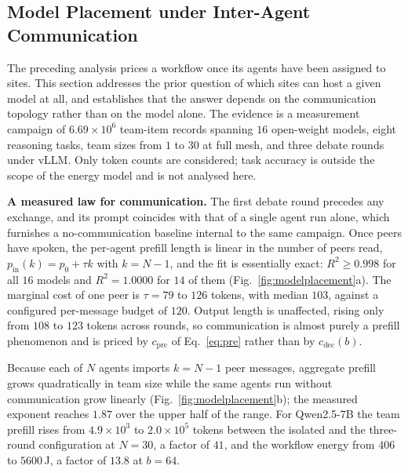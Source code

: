 \documentclass[journal]{IEEEtran}
\newif\ifshowchanges \showchangestrue
\newcommand{\ROOF}{\ifshowchanges\color{green!45!black}\fi}
\begin{document}
\subsection{\ROOF{}Model Placement under Inter-Agent Communication}\label{sec:modelplacement}
The preceding analysis prices a workflow once its agents have been assigned to sites. This
section addresses the prior question of which sites can host a given model at all, and
establishes that the answer depends on the communication topology rather than on the model alone.
The evidence is a measurement campaign of $6.69\times10^{6}$ team-item records spanning $16$
open-weight models, eight reasoning tasks, team sizes from $1$ to $30$ at full mesh, and three
debate rounds under vLLM. Only token counts are considered; task accuracy is outside the scope of
the energy model and is not analysed here.

\ROOF{}\textbf{A measured law for communication.} The first debate round precedes any exchange, and its
prompt coincides with that of a single agent run alone, which furnishes a no-communication
baseline internal to the same campaign. Once peers have spoken, the per-agent prefill length is
linear in the number of peers read, $p_{\mathrm{in}}(k)=p_{0}+\tau k$ with $k=N-1$, and the fit is
essentially exact: $R^{2}\ge0.998$ for all $16$ models and $R^{2}=1.0000$ for $14$ of them
(Fig.~\ref{fig:modelplacement}a). The marginal cost of one peer is $\tau=79$ to $126$ tokens,
with median $103$, against a configured per-message budget of $120$. Output length is unaffected,
rising only from $108$ to $123$ tokens across rounds, so communication is almost purely a prefill
phenomenon and is priced by $c_{\mathrm{pre}}$ of Eq.~\eqref{eq:pre} rather than by $c_{\mathrm{dec}}(b)$.

\ROOF{}Because each of $N$ agents imports $k=N-1$ peer messages, aggregate prefill grows quadratically in
team size while the same agents run without communication grow linearly
(Fig.~\ref{fig:modelplacement}b); the measured exponent reaches $1.87$ over the upper half of the
range. For Qwen2.5-7B the team prefill rises from $4.9\times10^{3}$ to $2.0\times10^{5}$ tokens
between the isolated and the three-round configuration at $N=30$, a factor of $41$, and the
workflow energy from $406$ to $5600$\,J, a factor of $13.8$ at $b=64$.
\end{document}

